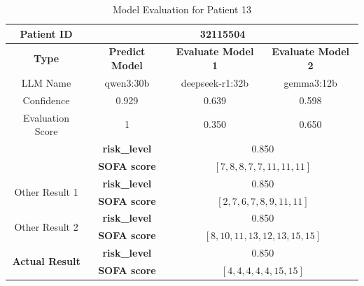 \begin{table}[htbp]
 \centering
 \caption{Model Evaluation for Patient 13}
 \label{tab:patient13}
 \begin{tabular}{cccc}
 \toprule
 \textbf{ Patient ID } & \multicolumn{3}{c}{32115504} \\
 \midrule
 \textbf{ Type } & \textbf{ Predict Model } & \textbf{ Evaluate Model 1 } & \textbf{ Evaluate Model 2 } \\
 LLM Name & qwen3:30b & deepseek-r1:32b & gemma3:12b \\
 Confidence & 0.929 & 0.639 & 0.598 \\
 Evaluation Score & 1 & 0.350 & 0.650 \\
 \midrule
 \addlinespace
 \multirow{2}{*}{\textbf{ Best Result }} & \textbf{ risk\_level } & \multicolumn{2}{c}{0.850} \\
      & \textbf{ SOFA score } & \multicolumn{2}{c}{$[7, 8, 8, 7, 7, 11, 11, 11]$} \\
 \midrule
 \multirow{2}{*}{Other Result 1} & \textbf{ risk\_level } & \multicolumn{2}{c}{0.850} \\
      & \textbf{ SOFA score } & \multicolumn{2}{c}{$[2, 7, 6, 7, 8, 9, 11, 11]$} \\
 \midrule
 \multirow{2}{*}{Other Result 2} & \textbf{ risk\_level } & \multicolumn{2}{c}{0.850} \\
      & \textbf{ SOFA score } & \multicolumn{2}{c}{$[8, 10, 11, 13, 12, 13, 15, 15]$} \\
 \midrule
 \multirow{2}{*}{\textbf{ Actual Result }} & \textbf{ risk\_level } & \multicolumn{2}{c}{0.850} \\
      & \textbf{ SOFA score } & \multicolumn{2}{c}{$[4, 4, 4, 4, 4, 15, 15]$} \\
 \bottomrule
 \end{tabular}
\end{table}

